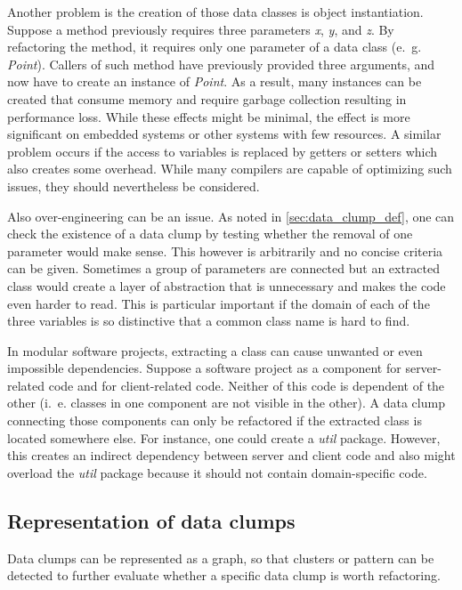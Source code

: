 Another problem is the creation of those data classes is object instantiation. Suppose a method previously requires three parameters \textit{x}, \textit{y}, and \textit{z}. By refactoring the method, it requires only one parameter of a data class (e.~g. \textit{Point}). Callers of such method have previously provided three arguments, and now have to create an instance of \textit{Point}. As a result, many instances can be created that consume memory and require garbage collection resulting in performance loss. While these effects might be minimal, the effect is more significant on embedded systems or other systems with few resources. A similar problem occurs if the access to variables is replaced by getters or setters which also creates some overhead. While many compilers are capable of optimizing such issues, they should nevertheless be considered. 

Also over-engineering can be an issue. As noted in \ref{sec:data_clump_def}, one can check the existence of a data clump by testing whether the removal of one parameter would make sense. This however is arbitrarily and no concise criteria can be given. Sometimes a group of parameters are connected but an extracted class would create a layer of abstraction that is unnecessary and makes the code even harder to read. This is particular important if the domain of each of the three variables is so distinctive that a common class name is hard to find.

In modular software projects, extracting a class can cause unwanted or even impossible dependencies.  Suppose a software project as a component for server-related code and for client-related code. Neither of this code is dependent of the other (i.~e. classes in one component are not visible in the other). A data clump connecting those components can only be refactored if the extracted class is located somewhere else. For instance, one could create a \textit{util} package. However, this creates an indirect dependency between server and client code and also might overload the \textit{util} package because it should not contain domain-specific code. 

\subsection{Representation of data clumps}\label{sec:data_clump_graph}

Data clumps can be represented as a graph, so that clusters or pattern can be detected to further evaluate whether a specific data clump is worth refactoring. 

